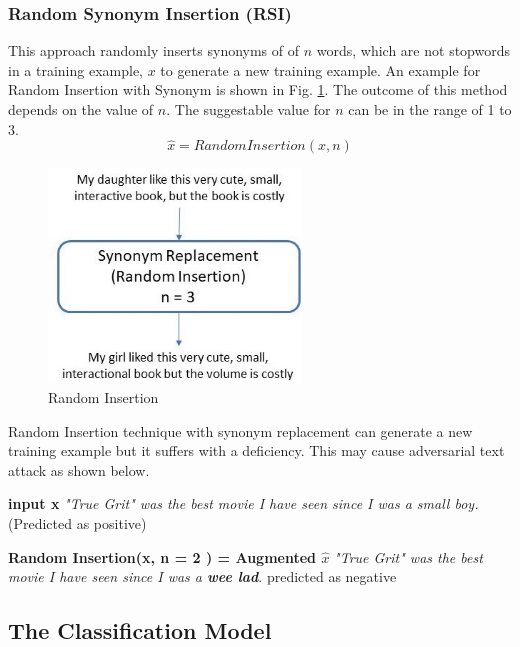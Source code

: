 \documentclass{article}
\begin{document}
\subsubsection{Random Synonym Insertion (RSI)}
This approach randomly inserts synonyms of of $n$ words, which are not stopwords in a training example, $x$ to generate a new training example. An example for Random Insertion with Synonym is shown in Fig. \ref{fig:randominsert}. The outcome of this method depends on the value of $n$. The suggestable value for $n$ can be in the range of 1 to 3. 
\begin{equation}
\hat{x} = RandomInsertion(x, n)
\end{equation}

\begin{figure}[h!]
\centering
  \includegraphics[width=0.6\textwidth]{random insertion.jpg}
  \caption{Random Insertion}
  \label{fig:randominsert}
\end{figure}

Random Insertion technique with synonym replacement can generate a new training example but it suffers with a deficiency. This may cause adversarial text attack as shown below.

\textbf{input x} \textrightarrow \textit{"True Grit" was the best movie I have seen since I was a small boy.} (Predicted as positive)

\textbf{Random Insertion(x, n = 2 ) = Augmented $\hat{x}$} \textrightarrow \textit{"True Grit" was the best movie I have seen since I was a \textbf{wee lad}}. {predicted as negative}


\subsection{The Classification Model}	
\end{document}
